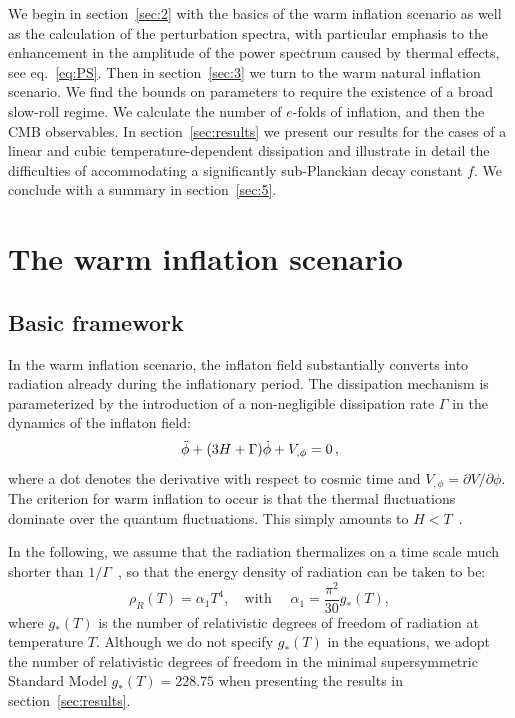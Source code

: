 \documentclass[a4paper,11pt]{article}
\begin{document}
We begin in section~\ref{sec:2} with the basics of the warm inflation scenario as well as the calculation of the perturbation spectra, with particular emphasis to the enhancement in the amplitude of the power spectrum caused by thermal effects, see eq.~\eqref{eq:PS}. Then in section~\ref{sec:3} we turn to the warm natural inflation scenario. We find the bounds on parameters to require the existence of a broad slow-roll regime. We calculate the number of $e$-folds of inflation, and then the CMB observables. In section~\ref{sec:results} we present our results for the cases of a linear and cubic temperature-dependent dissipation and illustrate in detail the difficulties of accommodating a significantly sub-Planckian decay constant $f$. We conclude with a summary in section~\ref{sec:5}.

\section{The warm inflation scenario
\label{sec:2}}
\subsection{Basic framework}

In the warm inflation scenario, the inflaton field substantially converts into radiation already during the inflationary period. The dissipation mechanism is parameterized by the introduction of a non-negligible dissipation rate $\Gamma$ in the dynamics of the inflaton field: 
\begin{equation}
    \Ddot{\phi}+(3H+\Gamma)\dot{\phi}+V_{,\phi}=0\,,
    \label{eq:2.1}
\end{equation}
where a dot denotes the derivative with respect to cosmic time and $V_{,\phi}=\partial V/\partial \phi$. The criterion for warm inflation to occur is that the thermal fluctuations dominate over the quantum fluctuations. This simply amounts to $H<T$~\cite{Berera:1995ie}.

In the following, we assume that the radiation thermalizes on a time scale much shorter than $1/\Gamma$~\cite{Berera:1995wh,Berera:1995ie}, so that the energy density of radiation can be taken to be:
\begin{equation}
    \rho_R(T)=\alpha_1 T^4, \quad \text{with } \quad \alpha_1=\frac{\pi^2}{30}g_{*}(T), \label{eq:2.2}
\end{equation}
where $g_{*}(T)$ is the number of relativistic degrees of freedom of radiation at temperature $T$. Although we do not specify $g_{*}(T)$ in the equations, we adopt the number of relativistic degrees of freedom in the minimal supersymmetric Standard Model $g_{*}(T) = 228.75$ when presenting the results in section~\ref{sec:results}.
\end{document}
